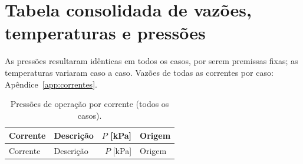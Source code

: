 \documentclass[11pt,a4paper]{article}
\numberwithin{equation}{section}
\numberwithin{table}{section}
\numberwithin{figure}{section}
\begin{document}
\section{Tabela consolidada de vazões, temperaturas e pressões}\label{sec:consol}
As pressões resultaram idênticas em todos os casos, por serem premissas fixas; as temperaturas variaram caso a caso. Vazões de todas as correntes por caso: Apêndice~\ref{app:correntes}.
\begin{longtable}{lL{7.3cm}rL{3.6cm}}
\caption{Pressões de operação por corrente (todos os casos).}\label{tab:press}\\\toprule
Corrente & Descrição & $P$ [kPa] & Origem\\\midrule\endfirsthead
\toprule Corrente & Descrição & $P$ [kPa] & Origem\\\midrule\endhead


\end{longtable}
\end{document}

